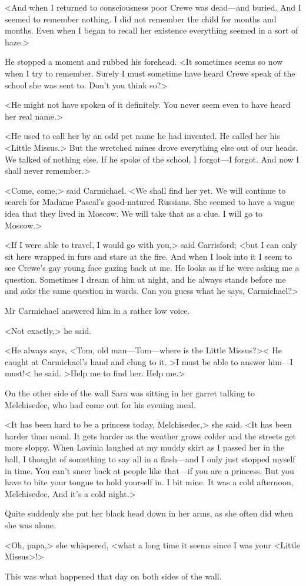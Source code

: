 <And when I returned to consciousness poor Crewe was dead—and buried. And I seemed to remember nothing. I did not remember the child for months and months. Even when I began to recall her existence everything seemed in a sort of haze.>

He stopped a moment and rubbed his forehead. <It sometimes seems so now when I try to remember. Surely I must sometime have heard Crewe speak of the school she was sent to. Don't you think so?>

<He might not have spoken of it definitely. You never seem even to have heard her real name.>

<He used to call her by an odd pet name he had invented. He called her his <Little Missus.> But the wretched mines drove everything else out of our heads. We talked of nothing else. If he spoke of the school, I forgot—I forgot. And now I shall never remember.>

<Come, come,> said Carmichael. <We shall find her yet. We will continue to search for Madame Pascal's good-natured Russians. She seemed to have a vague idea that they lived in Moscow. We will take that as a clue. I will go to Moscow.>

<If I were able to travel, I would go with you,> said Carrisford; <but I can only sit here wrapped in furs and stare at the fire. And when I look into it I seem to see Crewe's gay young face gazing back at me. He looks as if he were asking me a question. Sometimes I dream of him at night, and he always stands before me and asks the same question in words. Can you guess what he says, Carmichael?>

Mr Carmichael answered him in a rather low voice.

<Not exactly,> he said.

<He always says, <Tom, old man—Tom—where is the Little Missus?>< He caught at Carmichael's hand and clung to it. >I must be able to answer him—I must!< he said. >Help me to find her. Help me.>


On the other side of the wall Sara was sitting in her garret talking to Melchisedec, who had come out for his evening meal.

<It has been hard to be a princess today, Melchisedec,> she said. <It has been harder than usual. It gets harder as the weather grows colder and the streets get more sloppy. When Lavinia laughed at my muddy skirt as I passed her in the hall, I thought of something to say all in a flash—and I only just stopped myself in time. You can't sneer back at people like that—if you are a princess. But you have to bite your tongue to hold yourself in. I bit mine. It was a cold afternoon, Melchisedec. And it's a cold night.>

Quite suddenly she put her black head down in her arms, as she often did when she was alone.

<Oh, papa,> she whispered, <what a long time it seems since I was your <Little Missus>!>

This was what happened that day on both sides of the wall.